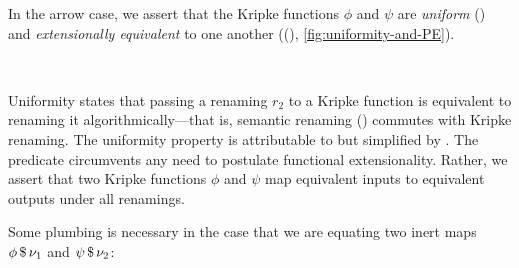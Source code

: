 \documentclass[sigplan,screen]{acmart}
\begin{document}
\Ni In the arrow case, we assert that the Kripke functions $\phi$ and $\psi$ are \emph{uniform} () and \emph{extensionally equivalent} to one another ((), \cref{fig:uniformity-and-PE}). 

\begin{AgdaAlign}
\begin{code}%
%
\>[2]\AgdaSpace{}%
\AgdaSymbol{\{}\AgdaSymbol{\}}\AgdaSpace{}%
\AgdaSymbol{\{}\AgdaSpace{}%
\AgdaSymbol{=}\AgdaSpace{}%
\AgdaSpace{}%
\AgdaSpace{}%
\AgdaSymbol{\}}\AgdaSpace{}%
\AgdaSpace{}%
\AgdaSpace{}%
\AgdaSymbol{=}\<%
\\
\>[2][@{}l@{\AgdaIndent{0}}]%
\>[4]\AgdaSpace{}%
\AgdaSpace{}%
\AgdaSpace{}%
\AgdaSpace{}%
\AgdaSpace{}%
\AgdaSpace{}%
\AgdaSpace{}%
\AgdaSymbol{\{}\AgdaSymbol{\}}\AgdaSpace{}%
\AgdaSpace{}%
\<%
\end{code}
\end{AgdaAlign}

\Ni Uniformity states that passing a renaming $r_2$ to a Kripke function is equivalent to renaming it algorithmically---that is, semantic renaming () commutes with Kripke renaming. The uniformity property is attributable to \citet{AllaisBM13} but simplified by \citet{ChapmanKNW19}. The  predicate circumvents any need to postulate functional extensionality. Rather, we assert that two Kripke functions $\phi$ and $\psi$ map equivalent inputs to equivalent outputs under all renamings.

Some plumbing is necessary in the case that we are equating two inert maps ${\phi} \, \mathdollar \, \nu_1$ and ${\psi} \, \mathdollar \, \nu_2$: 
\end{document}
